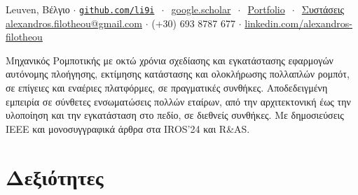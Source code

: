 \documentclass[a4paper,10pt,twoside]{article}
\begin{document}

\par{\bigskip\par}

\begin{center}
\vspace{-0.5em}
  {\small
   Leuven, Βέλγιο $\cdot$
  \href{https://github.com/li9i/}{\texttt{github.com/li9i}} $\ \cdot\ $ \href{https://scholar.google.com/citations?hl=en&view_op=list_works&gmla=AKzYXQ2ZNs_wAOy2e75F24-NJ0AGC7eeo8hugORYe3HG61yfKTR1H8vsWVf-C05DUq2qxvo9xqCvr6kF3qWTB4dIM-IJ&user=9_hI4hMAAAAJ}{google.scholar} $\ \cdot\ $ \href{https://docs.google.com/viewerng/viewer?url=https://raw.githubusercontent.com/li9i/portfolio/master/portfolio.pdf}{Portfolio} $\ \cdot \ $ \href{https://docs.google.com/viewerng/viewer?url=https://raw.githubusercontent.com/li9i/cv/master/references/references_alexandros_filotheou.pdf}{Συστάσεις} \\
  \href{mailto:alexandros.filotheou@gmail.com}{alexandros.filotheou@gmail.com} $\cdot$ (+30) 693 8787 677 $\cdot$ \href{https://www.linkedin.com/in/alexandros-filotheou/}{linkedin.com/alexandros-filotheou}
  }
\end{center}\vspace{-0.75em}

\begin{gg_box} \small
Μηχανικός Ρομποτικής με οκτώ χρόνια σχεδίασης και εγκατάστασης εφαρμογών αυτόνομης πλοήγησης, εκτίμησης κατάστασης και ολοκλήρωσης πολλαπλών ρομπότ, σε επίγειες και εναέριες πλατφόρμες, σε πραγματικές συνθήκες. Αποδεδειγμένη εμπειρία σε σύνθετες ενσωματώσεις πολλών εταίρων, από την αρχιτεκτονική έως την υλοποίηση και την εγκατάσταση στο πεδίο, σε διεθνείς συνθήκες. Με δημοσιεύσεις IEEE και μονοσυγγραφικά άρθρα στα IROS'24 και R\&AS.
\end{gg_box}

\section{\textbf{Δεξιότητες}}\verticalspacebetweensectionandcontent\vspace{-0.75em}
\end{document}
